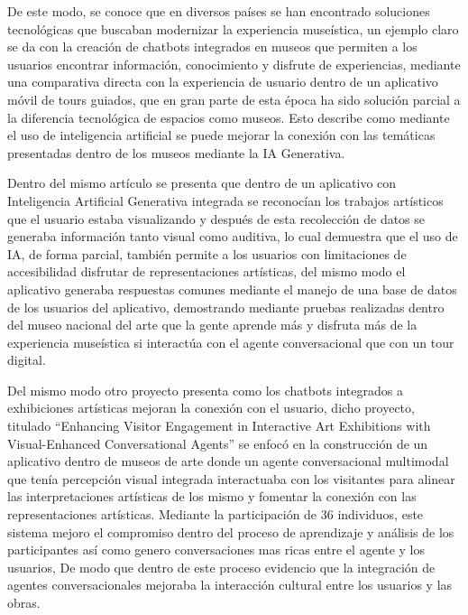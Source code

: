 \documentclass[pdflatex,sn-mathphys-num]{sn-jnl}%
\theoremstyle{thmstyleone}%
\theoremstyle{thmstyletwo}%
\theoremstyle{thmstylethree}%
\begin{document}
De este modo, se conoce que en diversos países se han encontrado soluciones tecnológicas  que buscaban modernizar la experiencia museística, un ejemplo claro se da con la creación de chatbots integrados en museos que permiten a los usuarios encontrar información, conocimiento y disfrute de experiencias, mediante una comparativa directa con la experiencia de usuario dentro de un aplicativo móvil de tours guiados, que en gran parte de esta época ha sido solución parcial a la diferencia tecnológica de espacios como museos. Esto describe  como mediante el uso de inteligencia artificial se puede mejorar la conexión con las temáticas presentadas dentro de los museos mediante la IA Generativa.\cite{Wang2025}

Dentro del mismo artículo se presenta que dentro de un aplicativo con Inteligencia Artificial Generativa integrada se reconocían los trabajos artísticos que el usuario estaba visualizando y después de esta recolección de datos se generaba información tanto visual como auditiva,\cite{Wang2025} lo cual demuestra que el uso de IA, de forma parcial, también permite a los usuarios con limitaciones de accesibilidad disfrutar de representaciones artísticas, del mismo modo el aplicativo generaba respuestas comunes mediante el manejo de una base de datos de los usuarios del aplicativo, demostrando mediante pruebas realizadas dentro del museo nacional del arte que la gente aprende más y disfruta más de la experiencia museística si interactúa con el agente conversacional que con un tour digital.

Del mismo modo otro proyecto presenta como los chatbots integrados a exhibiciones artísticas mejoran la conexión con el usuario, dicho proyecto, titulado “Enhancing Visitor Engagement in Interactive Art Exhibitions with Visual-Enhanced Conversational Agents” se enfocó en la construcción de un aplicativo dentro de museos de arte donde un agente conversacional multimodal que tenía percepción visual integrada interactuaba con los visitantes para alinear las interpretaciones artísticas de los mismo y fomentar la conexión con las representaciones artísticas. \cite{Ho2025} Mediante la participación de 36 individuos, este sistema mejoro el compromiso dentro del proceso de aprendizaje y análisis de los participantes así como genero conversaciones mas ricas entre el agente y los usuarios, De modo que dentro de este proceso evidencio que la integración de agentes conversacionales mejoraba la interacción cultural entre los usuarios y las obras.
\end{document}
